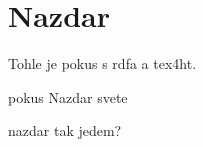 \documentclass{article}
\begin{document}
\section{Nazdar}

Tohle je pokus s rdfa a tex4ht. 

\begin{subject}{pokus}
Nazdar svete

\begin{subject}{nazdar}
tak jedem?
\end{subject}

\end{subject}
\end{document}
